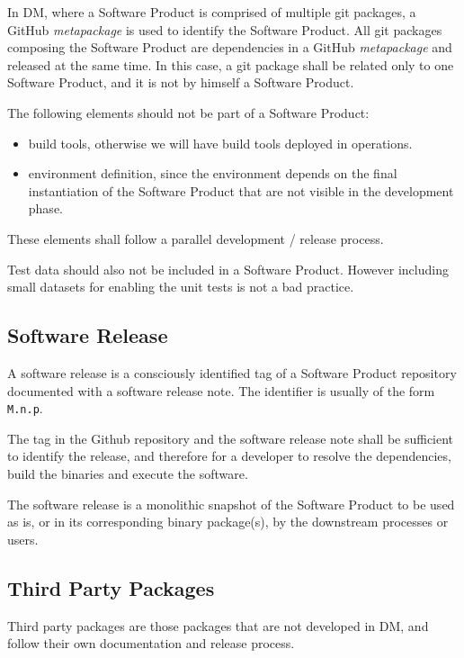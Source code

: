 In DM, where a Software Product is comprised of multiple git packages, a GitHub \textit{metapackage} is used to identify the Software Product.
All git packages composing the Software Product are dependencies in a GitHub \textit{metapackage} and released at the same time.
In this case, a git package shall be related only to one Software Product, and it is not by himself a Software Product.

The following elements should not be part of a Software Product:

\begin{itemize}
\item build tools, otherwise we will have build tools deployed in operations.
\item environment definition, since the environment depends on the final instantiation of the Software Product that are not visible in the development phase.
\end{itemize}

These elements shall follow a parallel development / release process.

Test data should also not be included in a Software Product. However including small datasets for enabling the unit tests is not a bad practice.


\subsection{Software Release} \label{sec:defrelease}

A software release is a consciously identified tag of a Software Product repository documented with a software release note.
The identifier is usually of the form \texttt{M.n.p}.

The tag in the Github repository and the software release note shall be sufficient to identify the release, and therefore for a developer
to resolve the dependencies, build the binaries and execute the software.

The software release is a monolithic snapshot of the Software Product to be used as is, or in its corresponding binary package(s), by the downstream processes or users.


\subsection{Third Party Packages}

Third party packages are those packages that are not developed in DM, and follow their own documentation and release process.


